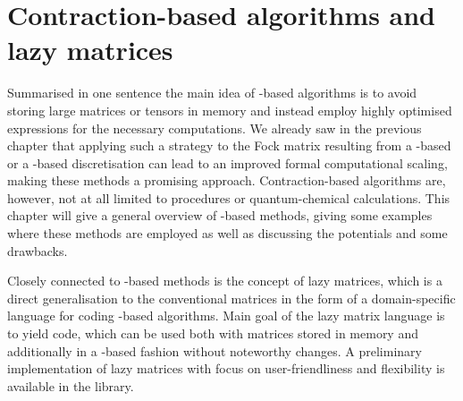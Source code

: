 \chapter{Contraction-based algorithms and lazy matrices}
\label{ch:LazyMatrices}
%
%

\noindent
Summarised in one sentence the main idea of \contraction-based algorithms
is to avoid storing large matrices or tensors in memory
and instead employ highly optimised
\contraction expressions for the necessary computations.
We already saw in the previous chapter that applying
such a strategy to the Fock matrix resulting from a \FE-based
or a \CS-based discretisation
can lead to an improved formal computational scaling,
making these methods a promising approach.
Contraction-based algorithms are, however,
not at all limited to \SCF procedures or quantum-chemical calculations.
This chapter will give a general overview
of \contraction-based methods,
giving some examples where these methods are employed
as well as discussing the potentials and some drawbacks.

Closely connected to \contraction-based methods is the concept of lazy matrices,
which is a direct generalisation to the conventional matrices
in the form of a domain-specific language
for coding \contraction-based algorithms.
Main goal of the lazy matrix language is to yield code,
which can be used both with matrices stored in memory
and additionally in a \contraction-based fashion without noteworthy changes.
A preliminary \cpp implementation of lazy matrices
with focus on user-friendliness and flexibility
is available in the \lazyten library.



